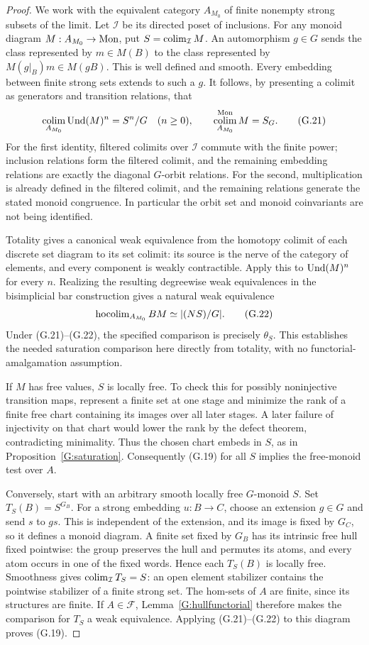 \begin{proof}
We work with the equivalent category $A_{M_0}$ of finite nonempty
strong subsets of the limit. Let $\mathcal I$ be its directed
poset of inclusions. For any monoid diagram $M:A_{M_0}\to\mathrm{Mon}$,
put $S=\operatorname*{colim}_{\mathcal I}M$. An automorphism $g\in G$ sends
the class represented by $m\in M(B)$ to the class represented
by $M(g|_B)m\in M(gB)$. This is well defined and smooth.
Every embedding between finite strong sets extends to such a $g$.
It follows, by presenting a colimit as generators and transition
relations, that
\[
 \operatorname*{colim}_{A_{M_0}}\operatorname{Und}(M)^n=S^n/G\quad(n\ge0),
 \qquad \operatorname*{colim}_{A_{M_0}}^{\mathrm{Mon}}M=S_G.
 \tag{G.21}
\]
For the first identity, filtered colimits over $\mathcal I$
commute with the finite power; inclusion relations form the
filtered colimit, and the remaining embedding relations are
exactly the diagonal $G$-orbit relations. For the second,
multiplication is already defined in the filtered colimit, and
the remaining relations generate the stated monoid congruence.
In particular the orbit set and monoid coinvariants are not
being identified.

Totality gives a canonical weak equivalence from the homotopy
colimit of each discrete set diagram to its set colimit: its
source is the nerve of the category of elements, and every
component is weakly contractible. Apply this to $\operatorname{Und}(M)^n$
for every $n$. Realizing the resulting degreewise weak
equivalences in the bisimplicial bar construction gives a
natural weak equivalence
\[
 \operatorname{hocolim}_{A_{M_0}}BM\simeq |(NS)/G|.
 \tag{G.22}
\]
Under (G.21)--(G.22), the specified comparison is precisely
$\theta_S$. This establishes the needed saturation comparison
here directly from totality, with no functorial-amalgamation
assumption.

If $M$ has free values, $S$ is locally free. To check this for
possibly noninjective transition maps, represent a finite set
at one stage and minimize the rank of a finite free chart
containing its images over all later stages. A later failure
of injectivity on that chart would lower the rank by the
defect theorem, contradicting minimality. Thus the chosen
chart embeds in $S$, as in Proposition~\ref{G:saturation}.
Consequently (G.19) for all $S$ implies the free-monoid test
over $A$.

Conversely, start with an arbitrary smooth locally free
$G$-monoid $S$. Set $T_S(B)=S^{G_B}$. For a strong embedding
$u:B\to C$, choose an extension $g\in G$ and send $s$ to $gs$.
This is independent of the extension, and its image is fixed
by $G_C$, so it defines a monoid diagram. A finite set fixed
by $G_B$ has its intrinsic free hull fixed pointwise: the
group preserves the hull and permutes its atoms, and every
atom occurs in one of the fixed words. Hence each $T_S(B)$
is locally free. Smoothness gives
$\operatorname*{colim}_{\mathcal I}T_S=S$: an open element stabilizer
contains the pointwise stabilizer of a finite strong set.
The hom-sets of $A$ are finite, since its structures are finite.
If $A\in\mathcal F$, Lemma~\ref{G:hullfunctorial} therefore
makes the comparison for $T_S$ a weak equivalence. Applying
(G.21)--(G.22) to this diagram proves (G.19).


\end{proof}
